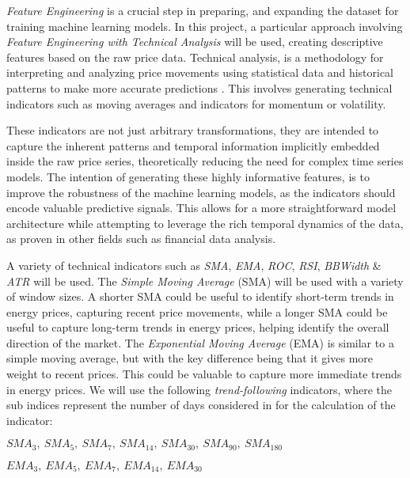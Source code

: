 \documentclass[12pt]{report} %
\begin{document}
\textit{Feature Engineering} is a crucial step in preparing, and expanding the dataset for training machine learning models. In this project, a particular approach involving \textit{Feature Engineering with Technical Analysis} will be used, creating descriptive features based on the raw price data. Technical analysis, is a methodology for interpreting and analyzing price movements using statistical data and historical patterns to make more accurate predictions \cite{ta-academic}. This involves generating technical indicators such as moving averages and indicators for momentum or volatility.


These indicators are not just arbitrary transformations, they are intended to capture the inherent patterns and temporal information implicitly embedded inside the raw price series, theoretically reducing the need for complex time series models. The intention of generating these highly informative features, is to improve the robustness of the machine learning models, as the indicators should encode valuable predictive signals. This allows for a more straightforward model architecture while attempting to leverage the rich temporal dynamics of the data, as proven in other fields such as financial data analysis.

A variety of technical indicators such as \textit{SMA}, \textit{EMA}, \textit{ROC}, \textit{RSI}, \textit{BBWidth} \& \textit{ATR} will be used. The \textit{Simple Moving Average} (SMA) will be used with a variety of window sizes. A shorter SMA could be useful to identify short-term trends in energy prices, capturing recent price movements, while a longer SMA could be useful to capture long-term trends in energy prices, helping identify the overall direction of the market. The \textit{Exponential Moving Average} (EMA) is similar to a simple moving average, but with the key difference being that it gives more weight to recent prices. This could be valuable to capture more immediate trends in energy prices. We will use the following \textit{trend-following} indicators, where the sub indices represent the number of days considered in for the calculation of the indicator:

    $ SMA_{3},\ SMA_{5},\ SMA_{7},\ SMA_{14},\ SMA_{30},\ SMA_{90},\ SMA_{180} $
    
    $ EMA_{3},\ EMA_{5},\ EMA_{7},\ EMA_{14},\ EMA_{30}  $
\end{document}
